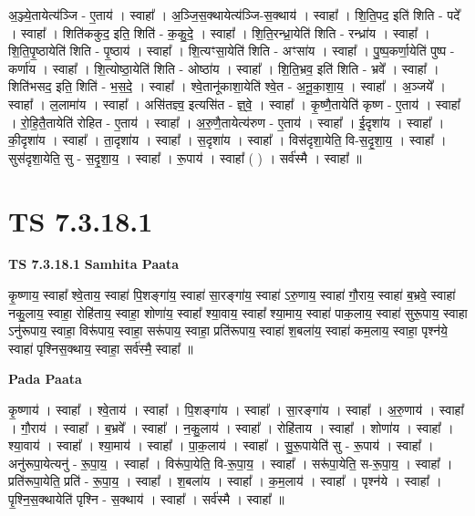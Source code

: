 \documentclass[17pt]{extarticle}
\begin{document}
अ॒ञ्ज्ये॒तायेत्य॑ञ्जि - ए॒ताय॑ । स्वाहा᳚ । अ॒ञ्जि॒स॒क्थायेत्य॑ञ्जि-स॒क्थाय॑ । स्वाहा᳚ । शि॒ति॒पद॒ इति॑ शिति - पदे᳚ । स्वाहा᳚ । शिति॑ककुद॒ इति॒ शिति॑ - क॒कु॒दे॒ । स्वाहा᳚ । शि॒ति॒रन्ध्रा॒येति॑ शिति - रन्ध्रा॑य । स्वाहा᳚ । शि॒ति॒पृ॒ष्ठायेति॑ शिति - पृ॒ष्ठाय॑ । स्वाहा᳚ । शि॒त्यꣳसा॒येति॑ शिति - अꣳसा॑य । स्वाहा᳚ । पु॒ष्प॒कर्णा॒येति॑ पुष्प - कर्णा॑य । स्वाहा᳚ । शि॒त्योष्ठा॒येति॑ शिति - ओष्ठा॑य । स्वाहा᳚ । शि॒ति॒भ्रव॒ इति॑ शिति - भ्रवे᳚ । स्वाहा᳚ । शिति॑भसद॒ इति॒ शिति॑ - भ॒स॒दे॒ । स्वाहा᳚ । श्वे॒तानू॑काशा॒येति॑ श्वे॒त - अ॒नू॒का॒शा॒य॒ । स्वाहा᳚ । अ॒ञ्जये᳚ । स्वाहा᳚ । ल॒लामा॑य । स्वाहा᳚ । असि॑तज्ञ्व॒ इत्यसि॑त - ज्ञ्॒वे॒ । स्वाहा᳚ । कृ॒ष्णै॒तायेति॑ कृष्ण - ए॒ताय॑ । स्वाहा᳚ । रो॒हि॒तै॒तायेति॑ रोहित - ए॒ताय॑ । स्वाहा᳚ । अ॒रु॒णै॒तायेत्य॑रुण - ए॒ताय॑ । स्वाहा᳚ । ई॒दृशा॑य । स्वाहा᳚ । की॒दृशा॑य । स्वाहा᳚ । ता॒दृशा॑य । स्वाहा᳚ । स॒दृशा॑य । स्वाहा᳚ । विस॑दृशा॒येति॒ वि-स॒दृ॒शा॒य॒ । स्वाहा᳚ । सुस॑दृशा॒येति॒ सु - स॒दृ॒शा॒य॒ । स्वाहा᳚ । रू॒पाय॑ । स्वाहा᳚ ( ) । सर्व॑स्मै । स्वाहा᳚ ॥  \newline




\section*{ TS 7.3.18.1 }

\textbf{TS 7.3.18.1 } \newline
\textbf{Samhita Paata} \newline

कृ॒ष्णाय॒ स्वाहा᳚ श्वे॒ताय॒ स्वाहा॑ पि॒शङ्गा॑य॒ स्वाहा॑ सा॒रङ्गा॑य॒ स्वाहा॑ ऽरु॒णाय॒ स्वाहा॑ गौ॒राय॒ स्वाहा॑ ब॒भ्रवे॒ स्वाहा॑ नकु॒लाय॒ स्वाहा॒ रोहि॑ताय॒ स्वाहा॒ शोणा॑य॒ स्वाहा᳚ श्या॒वाय॒ स्वाहा᳚ श्या॒माय॒ स्वाहा॑ पाक॒लाय॒ स्वाहा॑ सुरू॒पाय॒ स्वाहा ऽनु॑रूपाय॒ स्वाहा॒ विरू॑पाय॒ स्वाहा॒ सरू॑पाय॒ स्वाहा॒ प्रति॑रूपाय॒ स्वाहा॑ श॒बला॑य॒ स्वाहा॑ कम॒लाय॒ स्वाहा॒ पृश्न॑ये॒ स्वाहा॑ पृश्निस॒क्थाय॒ स्वाहा॒ सर्व॑स्मै॒ स्वाहा᳚ ॥ \newline

\textbf{Pada Paata} \newline

कृ॒ष्णाय॑ । स्वाहा᳚ । श्वे॒ताय॑ । स्वाहा᳚ । पि॒शङ्गा॑य । स्वाहा᳚ । सा॒रङ्गा॑य । स्वाहा᳚ । अ॒रु॒णाय॑ । स्वाहा᳚ । गौ॒राय॑ । स्वाहा᳚ । ब॒भ्रवे᳚ । स्वाहा᳚ । न॒कु॒लाय॑ । स्वाहा᳚ । रोहि॑ताय । स्वाहा᳚ । शोणा॑य । स्वाहा᳚ । श्या॒वाय॑ । स्वाहा᳚ । श्या॒माय॑ । स्वाहा᳚ । पा॒क॒लाय॑ । स्वाहा᳚ । सु॒रू॒पायेति॑ सु - रू॒पाय॑ । स्वाहा᳚ । अनु॑रूपा॒येत्यनु॑ - रू॒पा॒य॒ । स्वाहा᳚ । विरू॑पा॒येति॒ वि-रू॒पा॒य॒ । स्वाहा᳚ । सरू॑पा॒येति॒ स-रू॒पा॒य॒ । स्वाहा᳚ । प्रति॑रूपा॒येति॒ प्रति॑ - रू॒पा॒य॒ । स्वाहा᳚ । श॒बला॑य । स्वाहा᳚ । क॒म॒लाय॑ । स्वाहा᳚ । पृश्न॑ये । स्वाहा᳚ । पृ॒श्नि॒स॒क्थायेति॑ पृश्नि - स॒क्थाय॑ । स्वाहा᳚ । सर्व॑स्मै । स्वाहा᳚ ॥  \newline
\end{document}
